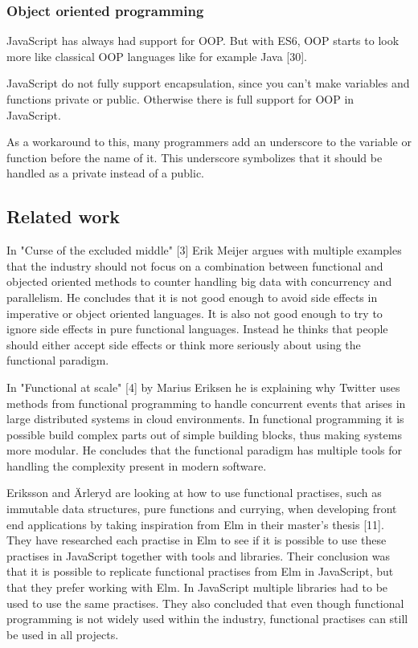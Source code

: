 \documentclass {article}
\begin{document}
\subsubsection{Object oriented programming}
JavaScript has always had support for OOP. But 
with ES6, OOP starts to look more like classical OOP languages like for example Java [30].

JavaScript do not fully support encapsulation, since you can't make variables and functions private or public. Otherwise there is full support for OOP in JavaScript.

As a  workaround to this, many programmers add an underscore to the variable or function before the name of it. This underscore symbolizes that it should be handled as a private instead of a public.
\subsection{Related work}
In "Curse of the excluded middle" [3] Erik Meijer argues with multiple examples that the industry should not focus on a combination between functional and objected oriented methods to counter handling big data with concurrency and parallelism. He concludes that it is not good enough to avoid side effects in imperative or object oriented languages. It is also not good enough to try to ignore side effects in pure functional languages. Instead he thinks that people should either accept side effects or think more seriously about using the functional paradigm.

In "Functional at scale" [4] by Marius Eriksen he is explaining why Twitter uses methods from functional programming to handle concurrent events that arises in large distributed systems in cloud environments. In functional programming it is possible build complex parts out of simple building blocks, thus making systems more modular. He concludes that the functional paradigm has multiple tools for handling the complexity present in modern software.

Eriksson and \"{A}rleryd are looking at how to use functional practises, such as immutable data structures, pure functions and currying, when developing front end applications by taking inspiration from Elm in their master's thesis [11]. They have researched each practise in Elm to see if it is possible to use these practises in JavaScript together with tools and libraries. Their conclusion was that it is possible to replicate functional practises from Elm in JavaScript, but that they prefer working with Elm. In JavaScript multiple libraries had to be used to use the same practises. They also concluded that even though functional programming is not widely used within the industry, functional practises can still be used in all projects.
\end{document}
